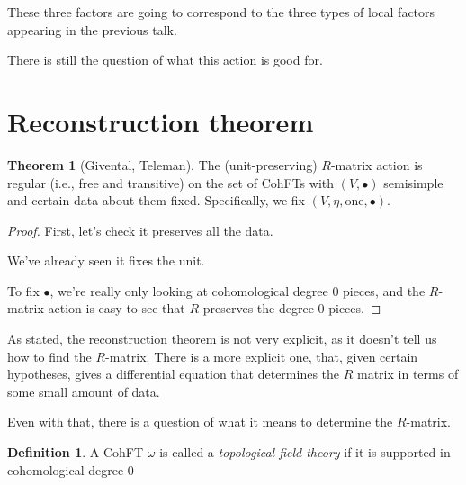 \documentclass{amsart}
\theoremstyle{definition}
\newtheorem{theorem}{Theorem}
\newtheorem{definition}{Definition}
\newcommand{\one}{\text{one}}
\begin{document}
These three factors are going to correspond to the three types of local factors appearing in the previous talk.

There is still the question of what this action is good for.
\section{Reconstruction theorem}

\begin{theorem}[Givental, Teleman]
The (unit-preserving) $R$-matrix action is regular (i.e., free and transitive) on the set of CohFTs with $(V,\bullet)$ semisimple and certain data about them fixed.  Specifically, we fix $(V,\eta,\one,\bullet)$.
\end{theorem}

\begin{proof}
First, let's check it preserves all the data.

We've already seen it fixes the unit.

To fix $\bullet$, we're really only looking at cohomological degree 0 pieces, and the $R$-matrix action is easy to see that $R$ preserves the degree 0 pieces.
\end{proof}


As stated, the reconstruction theorem is not very explicit, as it doesn't tell us how to find the $R$-matrix.  There is a more explicit one, that, given certain hypotheses, gives a differential equation that determines the $R$ matrix in terms of some small amount of data.

Even with that, there is a question of what it means to determine the $R$-matrix.

\begin{definition}
A CohFT $\omega$ is called a \emph{topological field theory} if it is supported in cohomological degree 0
\end{definition}
\end{document}
